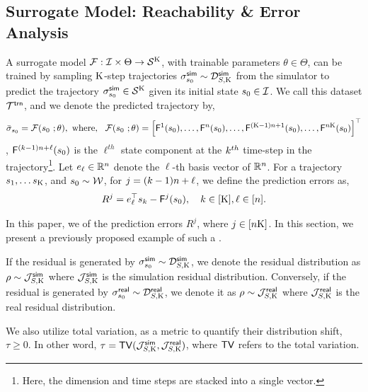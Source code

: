 \subsection{Surrogate Model: Reachability \& Error Analysis}
 \vspace{-2mm}
 A surrogate model $\mathcal{F}: \mathcal{I} \times \Theta \to \mathcal{S}^{\mathrm{K}}$, with trainable parameters $\theta \in \Theta$, can be trained by sampling $\mathrm{K}$-step trajectories $\sigma^{\mathsf{sim}}_{s_0} \sim \mathcal{D}_{S,\mathrm{K}}^{\mathsf{sim}}$ from the simulator to predict the trajectory $\sigma^{\mathsf{sim}}_{s_{0}} \in \mathcal{S}^{\mathrm{K}}$ given its initial state $s_0 \in \mathcal{I}$.  We call this dataset $\mathcal{T}^{\mathsf{trn}}$, and we denote the predicted trajectory by,
\begin{equation}\label{eq:surrogate}
\bar{\traj}_{\statee_{0}} = \overallf(\statee_{0}\ ; \theta),\ \text{where},\ \  \overallf(\statee_{0}\ ; \theta) = 
\left[\mathsf{F}^1(\statee_0), \ldots, \mathsf{F}^n(\statee_0),  \ldots, 
\mathsf{F}^{(\horizon-1)n+1}(\statee_0), \ldots, \mathsf{F}^{n\horizon}(\statee_0)\right]^\top 
\end{equation}
, $\mathsf{F}^{(k-1)n+\ell}(s_0)$ is the $\ell^{th}$ state component at the $k^{th}$ time-step in the trajectory\footnote{Here, the dimension and time steps are stacked into a single vector.}. Let $e_\ell\in\mathbb{R}^n$ denote the $\ell$-th basis vector of $\mathbb{R}^n$. For a trajectory $s_1, \ldots s_{\mathrm{K}}$, and $s_0 \sim \mathcal{W}$, for $j =(k-1)n+\ell$, we define the prediction errors as,
\begin{equation}
\label{eq:compwise_residual}
R^j =
e_{\ell}^\top s_k - \mathsf{F}^j(s_0), \quad k \in[\mathrm{K}], \ell\in[n].
\end{equation}


In this paper, we  of the prediction errors $R^j$, where $j \in [n\mathrm{K}]$. In this section, we present a previously proposed example of such a .
\begin{definition}
If the residual is generated by $\sigma^{\mathsf{sim}}_{s_0}\sim \mathcal{D}_{S,\mathrm{K}}^{\mathsf{sim}}$, we denote the residual distribution as $\rho \sim \mathcal{J}_{S,\mathrm{K}}^{\mathsf{sim}}$ where $\mathcal{J}_{S,\mathrm{K}}^{\mathsf{sim}}$ is the simulation residual distribution. Conversely, if the residual is generated by $\sigma^{\mathsf{real}}_{s_0}\sim \mathcal{D}_{S,\mathrm{K}}^{\mathsf{real}}$, we denote it as $\rho \sim \mathcal{J}_{S,\mathrm{K}}^{\mathsf{real}}$ where $\mathcal{J}_{S,\mathrm{K}}^{\mathsf{real}}$ is the real residual distribution.
\end{definition}
We also utilize total variation, \cite{takezawa2005introduction} as a metric to quantify their distribution shift, $\tau\geq 0$. In other word, $\tau = \mathsf{TV}(\mathcal{J}_{S,\mathrm{K}}^{\mathsf{sim}}, \mathcal{J}_{S,\mathrm{K}}^{\mathsf{real}})$, where $\mathsf{TV}$ refers to the total variation.

